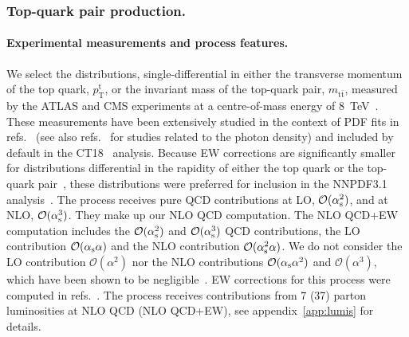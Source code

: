 \subsubsection{Top-quark pair production.}
\paragraph{Experimental measurements and process features.}
We select the distributions, single-differential in either the transverse
momentum of the top quark, $p_\mathrm{T}^\mathrm{t}$, or the invariant mass of the top-quark
pair, $m_{\mathrm{t}\bar{\mathrm{t}}}$, measured by the ATLAS and CMS experiments at a centre-of-mass
energy of \SI{8}{\tera\electronvolt}~\cite{Aad:2015mbv,Khachatryan:2015oqa}. These measurements have
been extensively studied in the context of PDF fits in
refs.~\cite{Czakon:2016olj,Bailey:2019yze,Amoroso:2020lgh,Kadir:2020yml} (see
also refs.~\cite{Pagani:2016caq,Czakon:2017wor} for studies related to the photon density) and
included by default in the CT18~\cite{Hou:2019efy} analysis.
Because EW corrections are significantly smaller for distributions differential
in the rapidity of either the top quark or the top-quark
pair~\cite{Czakon:2017wor}, these distributions were preferred for inclusion
in the NNPDF3.1 analysis~\cite{Ball:2017nwa}. The process receives
pure QCD contributions at LO, $\mathcal{O}(\alpha_\mathrm{s}^2)$, and
at NLO, $\mathcal{O}(\alpha_\mathrm{s}^3)$. They make up our NLO QCD
computation. The NLO QCD+EW computation includes the $\mathcal{O}(\alpha_\mathrm{s}^2)$
and $\mathcal{O}(\alpha_\mathrm{s}^3)$ QCD contributions, the LO contribution
$\mathcal{O}(\alpha_\mathrm{s}\alpha)$ and the NLO contribution
$\mathcal{O}(\alpha_\mathrm{s}^2\alpha)$.
We do not consider the LO contribution $\mathcal{O}(\alpha^2)$ nor the
NLO contributions $\mathcal{O}(\alpha_\mathrm{s}\alpha^2)$ and $\mathcal{O}(\alpha^3)$, which have been shown to be negligible~\cite{Czakon:2017wor,Frederix:2018nkq}.
EW corrections for this process
were computed in refs.~\cite{Bernreuther:2010ny,Hollik:2011ps,Kuhn:2011ri,Bernreuther:2012sx,Pagani:2016caq,Czakon:2017wor,Czakon:2017lgo,Czakon:2017mmr,Czakon:2019bcq,Czakon:2019txp}. The process receives contributions from
7 (37) parton luminosities at NLO QCD (NLO QCD+EW),
see appendix~\ref{app:lumis} for details.

